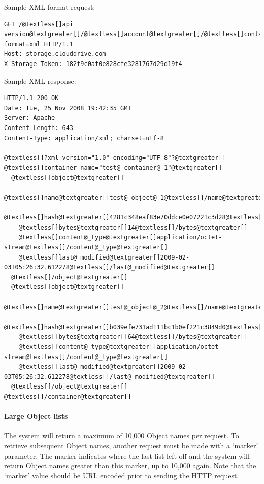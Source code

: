 \documentclass[letterpaper,10pt,english]{manual}
\begin{document}
Sample XML format request:

\begin{Verbatim}[commandchars=@\[\]]
GET /@textless[]api version@textgreater[]/@textless[]account@textgreater[]/@textless[]container@textgreater[]?format=xml HTTP/1.1
Host: storage.clouddrive.com
X-Storage-Token: 182f9c0af0e828cfe3281767d29d19f4
\end{Verbatim}

Sample XML response:

\begin{Verbatim}[commandchars=@\[\]]
HTTP/1.1 200 OK
Date: Tue, 25 Nov 2008 19:42:35 GMT
Server: Apache
Content-Length: 643
Content-Type: application/xml; charset=utf-8

@textless[]?xml version="1.0" encoding="UTF-8"?@textgreater[]
@textless[]container name="test@_container@_1"@textgreater[]
  @textless[]object@textgreater[]
    @textless[]name@textgreater[]test@_object@_1@textless[]/name@textgreater[]
    @textless[]hash@textgreater[]4281c348eaf83e70ddce0e07221c3d28@textless[]/hash@textgreater[]
    @textless[]bytes@textgreater[]14@textless[]/bytes@textgreater[]
    @textless[]content@_type@textgreater[]application/octet-stream@textless[]/content@_type@textgreater[]
    @textless[]last@_modified@textgreater[]2009-02-03T05:26:32.612278@textless[]/last@_modified@textgreater[]
  @textless[]/object@textgreater[]
  @textless[]object@textgreater[]
    @textless[]name@textgreater[]test@_object@_2@textless[]/name@textgreater[]
    @textless[]hash@textgreater[]b039efe731ad111bc1b0ef221c3849d0@textless[]/hash@textgreater[]
    @textless[]bytes@textgreater[]64@textless[]/bytes@textgreater[]
    @textless[]content@_type@textgreater[]application/octet-stream@textless[]/content@_type@textgreater[]
    @textless[]last@_modified@textgreater[]2009-02-03T05:26:32.612278@textless[]/last@_modified@textgreater[]
  @textless[]/object@textgreater[]
@textless[]/container@textgreater[]
\end{Verbatim}


\paragraph{Large Object lists}

The system will return a maximum of 10,000 Object names per request. To
retrieve subsequent Object names, another request must be made with a
`marker' parameter. The marker indicates where the last list left off
and the system will return Object names greater than this marker, up to
10,000 again.  Note that the ‘marker’ value should be URL encoded prior
to sending the HTTP request.
\end{document}

